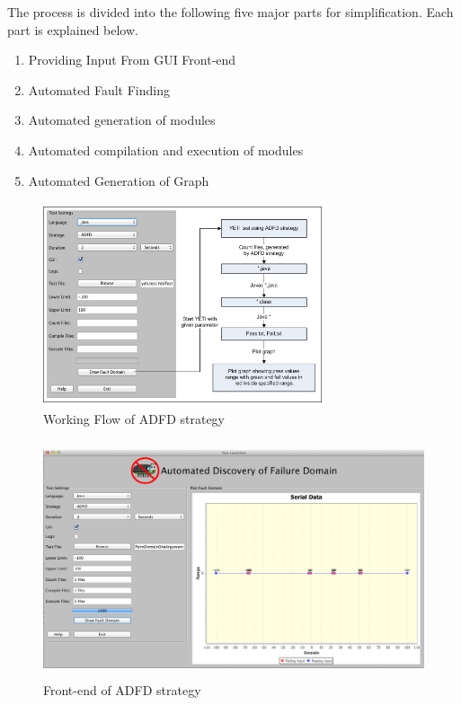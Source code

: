 \documentclass[runningheads,a4paper]{llncs}
\begin{document}
The process is divided into the following five major parts for simplification. Each part is explained below.

\begin{enumerate}
\item Providing Input From GUI Front-end
\item Automated Fault Finding
\item Automated generation of modules
\item Automated compilation and execution of modules
\item Automated Generation of Graph
\end{enumerate}

\begin{figure}[ht]
\centering
\includegraphics[width=8.2cm,height=6cm]{ADFD-Diagram1.png}
\caption{Working Flow of ADFD strategy}
\label{fig:ADFD}
\end{figure}

\begin{figure}[htp]
\begin{center}
\includegraphics[width=12cm,height=7cm]{ADFD-front-end.png}
\caption{Front-end of ADFD strategy}
\label{fig:ADFD}
\end{center}
\end{figure}
\end{document}
